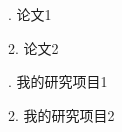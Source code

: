 \documentclass[twoside, workbib, UTF8, phd]{nputhesis}
\theoremstyle{plain}
\begin{document}
\backmatter
\printbibliography             %

\Appendix  %

\Thanks     %

\Work


. 论文1

2. 论文2

. 我的研究项目1

2. 我的研究项目2

\statement
\end{document}
